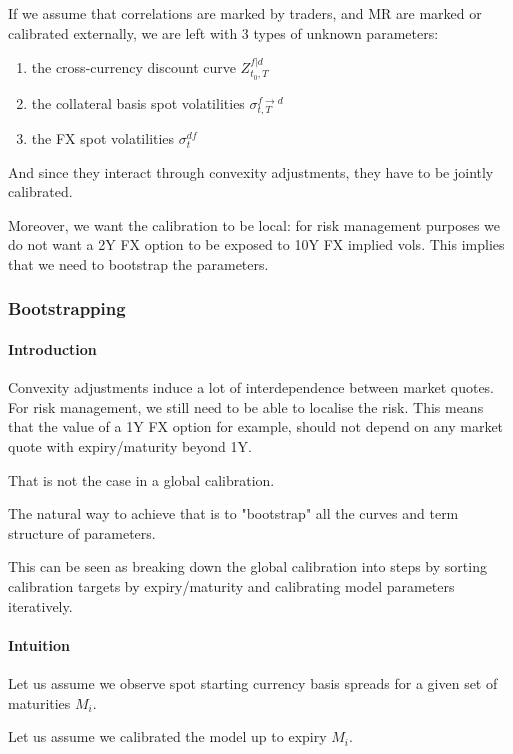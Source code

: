 \documentclass[11pt,english]{amsart}
\theoremstyle{definition}
\begin{document}
If we assume that correlations are marked by traders, and MR are marked or calibrated externally, we are left with 3 types of unknown parameters:
\begin{enumerate}
\item the cross-currency discount curve $Z^{f|d}_{t_0,T}$
\item the collateral basis spot volatilities  $\sigma^{f\to d}_{t,T}$
\item the FX spot volatilities $\sigma^{df}_{t}$
\end{enumerate}
And since they interact through convexity adjustments, they have to be jointly calibrated.

Moreover, we want the calibration to be local: for risk management purposes we do not want a 2Y FX option to be exposed to 10Y FX implied vols. This implies that we need to bootstrap the parameters.


\subsubsection{Bootstrapping}%

\paragraph{Introduction}
Convexity adjustments induce a lot of interdependence between market quotes. For risk management, we still need to be able to localise the risk. This means that the value of a 1Y FX option for example, should not depend on any market quote with expiry/maturity beyond 1Y.

That is not the case in a global calibration.

The natural way to achieve that is to "bootstrap" all the curves and term structure of parameters.

This can be seen as breaking down the global calibration into steps by sorting calibration targets by expiry/maturity and calibrating model parameters iteratively.

\paragraph{Intuition}
Let us assume we observe spot starting currency basis spreads for a given set of maturities $M_i$.

Let us assume we calibrated the model up to expiry $M_i$.
\end{document}
